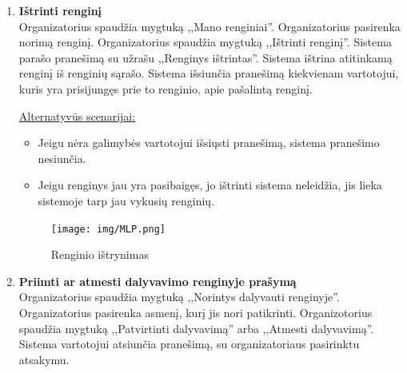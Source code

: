 \documentclass{VUMIFPSkursinis}
\begin{document}
\begin{enumerate} [label = \textbf{U\arabic*.}]
				\underline{Alternatyvūs scenarijai:}
				\begin{itemize}
					\item Jeigu nuotrauka buvo įdėta neatitinkanti standartų, sistema jos nededa prie aprašymo ir išsiunčia pranešimą apie nuotraukos klaidą.
					\item Jeigu renginys jau yra pasibaigęs, sistema neleidžia pakeisti nuotraukos ar pakeisti aprašymo, bet įgalima papildyti jau esamą aprašymą.
				\end{itemize}
				
				\begin{figure}[H]
					\centering
					\texttt{[image: img/MLP.png]}
					\caption{Renginio papildymo langas}
					\label{fig:prideti-aprasa}
				\end{figure}
				
			\item \textbf{Ištrinti renginį} \\
				Organizatorius spaudžia mygtuką ,,Mano renginiai''. 
				Organizatorius pasirenka norimą renginį.
				Organizatorius spaudžia mygtuką ,,Ištrinti renginį''. 
				Sistema parašo pranešimą su užrašu ,,Renginys ištrintas''. 
				Sistema ištrina atitinkamą renginį iš renginių sąrašo.
				Sistema išsiunčia pranešimą kiekvienam vartotojui, kuris yra prisijungęs prie to renginio, apie pašalintą renginį.
				
				\underline{Alternatyvūs scenarijai:}
				\begin{itemize}
					\item Jeigu nėra galimybės vartotojui išsiųsti pranešimą, sistema pranešimo nesiunčia.
					\item Jeigu renginys jau yra pasibaigęs, jo ištrinti sistema neleidžia, jis lieka sistemoje tarp jau vykusių renginių.
				\end{itemize}
				
				\begin{figure}[H]
					\centering
					\texttt{[image: img/MLP.png]}
					\caption{Renginio ištrynimas}
					\label{fig:istrinti-rengini}
				\end{figure}
				
			\item \textbf{Priimti ar atmesti dalyvavimo renginyje prašymą} \\
				Organizatorius spaudžia mygtuką ,,Norintys dalyvauti renginyje''.
				Organizatorius pasirenka asmenį, kurį jis nori patikrinti. 
				Organizotorius spaudžia mygtuką ,,Patvirtinti dalyvavimą'' arba ,,Atmesti dalyvavimą''. 
				Sistema vartotojui atsiunčia pranešimą, su organizatoriaus pasirinktu atsakymu.
				

\end{enumerate}
\end{document}

